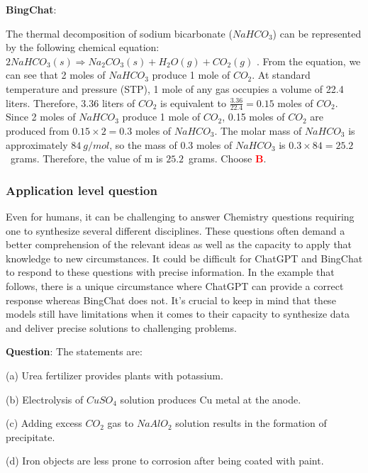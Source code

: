 \documentclass{article}
\begin{document}
{\begin{mdframed}[linewidth=1pt,linecolor=red]
		\textbf{BingChat}: 
		
		The thermal decomposition of sodium bicarbonate ($NaHCO_3$) can be represented by the following chemical equation: $2NaHCO_3(s) \Rightarrow Na_2CO_3(s)+H_2O(g)+CO_2(g)$ . From the equation, we can see that 2 moles of $NaHCO_3$ produce 1 mole of $CO_2$. At standard temperature and pressure (STP), 1 mole of any gas occupies a volume of 22.4 liters. Therefore, 3.36 liters of $CO_2$ is equivalent to $\frac{3.36}{22.4}=0.15$ moles of $CO_2$. Since 2 moles of $NaHCO_3$ produce 1 mole of $CO_2$, 0.15 moles of $CO_2$ are produced from $0.15\times2=0.3$ moles of $NaHCO_3$. The molar mass of $NaHCO_3$ is approximately $84~g/mol$, so the mass of 0.3 moles of $NaHCO_3$ is $0.3\times84=25.2$~grams. Therefore, the value of m is $25.2$~grams. Choose \textcolor{red}{\textbf{B}}. 
		
	\end{mdframed}	
	
	\subsubsection{Application level question}
	
	\label{VNHSGE_Che_A}
	
	Even for humans, it can be challenging to answer Chemistry questions requiring one to synthesize several different disciplines. These questions often demand a better comprehension of the relevant ideas as well as the capacity to apply that knowledge to new circumstances. It could be difficult for ChatGPT and BingChat to respond to these questions with precise information. In the example that follows, there is a unique circumstance where ChatGPT can provide a correct response whereas BingChat does not. It's crucial to keep in mind that these models still have limitations when it comes to their capacity to synthesize data and deliver precise solutions to challenging problems.
	
	
	\begin{mdframed}[linewidth=1pt,linecolor=red] \textbf{Question}: The statements are:
		
		(a) Urea fertilizer provides plants with potassium.
		
		(b) Electrolysis of $CuSO_4$ solution produces Cu metal at the anode.
		
		(c) Adding excess $CO_2$ gas to $NaAlO_2$ solution results in the formation of precipitate.
		
		(d) Iron objects are less prone to corrosion after being coated with paint.
		

\end{mdframed}}
\end{document}
